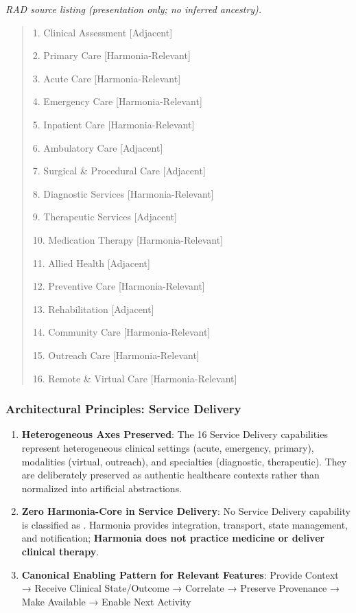 \textit{RAD source listing (presentation only; no inferred ancestry).}
\begin{quote}
1. Clinical Assessment [Adjacent]

2. Primary Care [Harmonia-Relevant]

3. Acute Care [Harmonia-Relevant]

4. Emergency Care [Harmonia-Relevant]

5. Inpatient Care [Harmonia-Relevant]

6. Ambulatory Care [Adjacent]

7. Surgical \& Procedural Care [Adjacent]

8. Diagnostic Services [Harmonia-Relevant]

9. Therapeutic Services [Adjacent]

10. Medication Therapy [Harmonia-Relevant]

11. Allied Health [Adjacent]

12. Preventive Care [Harmonia-Relevant]

13. Rehabilitation [Adjacent]

14. Community Care [Harmonia-Relevant]

15. Outreach Care [Harmonia-Relevant]

16. Remote \& Virtual Care [Harmonia-Relevant]
\end{quote}
\label{rad:enabling:379}
\subsubsection*{Architectural Principles: Service Delivery}
\label{rad:enabling:380}

\begin{enumerate}

\item 
\textbf{Heterogeneous Axes Preserved}: The 16 Service Delivery capabilities represent heterogeneous clinical settings (acute, emergency, primary), modalities (virtual, outreach), and specialties (diagnostic, therapeutic). They are deliberately preserved as authentic healthcare contexts rather than normalized into artificial abstractions.



\item 
\textbf{Zero Harmonia-Core in Service Delivery}: No Service Delivery capability is classified as \texttt{}. Harmonia provides integration, transport, state management, and notification; \textbf{Harmonia does not practice medicine or deliver clinical therapy}.



\item 
\textbf{Canonical Enabling Pattern for Relevant Features}: Provide Context → Receive Clinical State/\allowbreak{}Outcome → Correlate → Preserve Provenance → Make Available → Enable Next Activity



\end{enumerate}
\label{rad:enabling:385}


